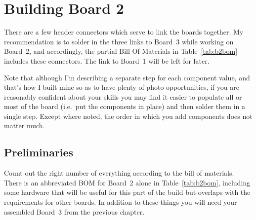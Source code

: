 
%
%
%
%
%
%

\chapter{Building Board 2}

There are a few header connectors which serve to link the boards together. 
My recommendation is to solder in the three links to Board~3 while working
on Board~2, and accordingly, the partial Bill Of Materials in
Table~\ref{tab:b2bom} includes these connectors.  The link to Board~1 will
be left for later.

Note that although I'm describing a separate step for each component value,
and that's how I built mine so as to have plenty of photo opportunities, if
you are reasonably confident about your skills you may find it easier to
populate all or most of the board (i.e.\ put the components in place) and
then solder them in a single step.  Except where noted, the order in which
you add components does not matter much.

\section{Preliminaries}

Count out the right number of everything according to the bill of materials. 
There is an abbreviated BOM for Board~2 alone in Table~\ref{tab:b2bom},
including some hardware that will be useful for this part of the build but
overlaps with the requirements for other boards.  In addition to these
things you will need your assembled Board~3 from the previous chapter.

